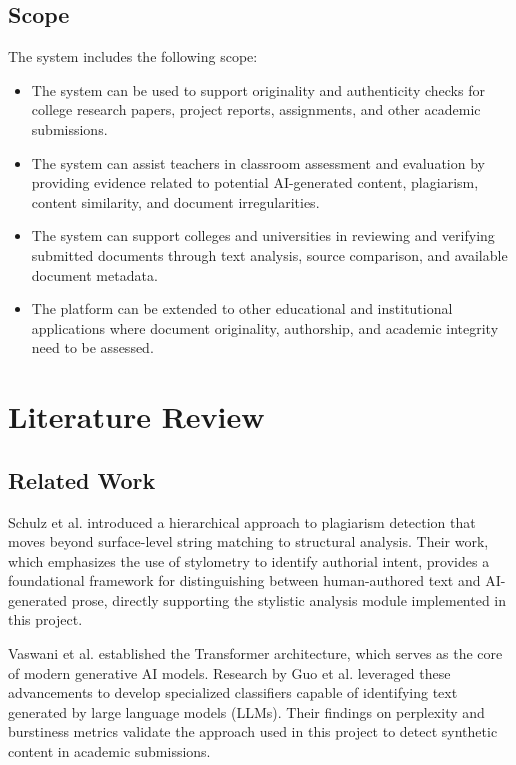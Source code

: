 \documentclass[12pt, a4paper]{report}
\numberwithin{equation}{chapter}
\begin{document}
\section{Scope}
The system includes the following scope:

\begin{itemize}
\item The system can be used to support originality and authenticity checks for college research papers, project reports, assignments, and other academic submissions.

\item The system can assist teachers in classroom assessment and evaluation by providing evidence related to potential AI-generated content, plagiarism, content similarity, and document irregularities.

\item The system can support colleges and universities in reviewing and verifying submitted documents through text analysis, source comparison, and available document metadata.

\item The platform can be extended to other educational and institutional applications where document originality, authorship, and academic integrity need to be assessed.
\end{itemize}

\chapter{Literature Review}

\section{Related Work}

Schulz et al. \cite{schulz} introduced a hierarchical approach to plagiarism detection that moves beyond surface-level string matching to structural analysis. Their work, which emphasizes the use of stylometry to identify authorial intent, provides a foundational framework for distinguishing between human-authored text and AI-generated prose, directly supporting the stylistic analysis module implemented in this project.

Vaswani et al. \cite{vaswani} established the Transformer architecture, which serves as the core of modern generative AI models. Research by Guo et al. \cite{guo} leveraged these advancements to develop specialized classifiers capable of identifying text generated by large language models (LLMs). Their findings on perplexity and burstiness metrics validate the approach used in this project to detect synthetic content in academic submissions.
\end{document}
